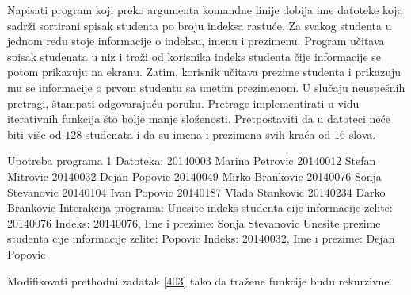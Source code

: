 \begin{Answer}[ref=402]
\end{Answer}
\begin{Exercise}[label=403]
  Napisati program koji preko argumenta komandne linije dobija ime
  datoteke koja sadrži sortirani spisak studenta po broju indeksa
  rastuće. Za svakog studenta u jednom redu stoje informacije o
  indeksu, imenu i prezimenu.  Program učitava spisak studenata u niz
  i traži od korisnika indeks studenta čije informacije se potom
  prikazuju na ekranu.  Zatim, korisnik učitava prezime studenta i
  prikazuju mu se informacije o prvom studentu sa unetim prezimenom.
  U slučaju neuspešnih pretragi, štampati odgovarajuću
  poruku. Pretrage implementirati u vidu iterativnih funkcija što
  bolje manje složenosti. Pretpostaviti da u datoteci neće biti više
  od $128$ studenata i da su imena i prezimena svih kraća od $16$
  slova.
  
\begin{maxitest}
\begin{test}{Upotreba programa 1}
Datoteka:
  20140003 Marina Petrovic
  20140012 Stefan Mitrovic
  20140032 Dejan Popovic
  20140049 Mirko Brankovic
  20140076 Sonja Stevanovic
  20140104 Ivan Popovic
  20140187 Vlada Stankovic
  20140234 Darko Brankovic
Interakcija programa:
  Unesite indeks studenta cije informacije zelite: 20140076
  Indeks: 20140076, Ime i prezime: Sonja Stevanovic
  Unesite prezime studenta cije informacije zelite: Popovic
  Indeks: 20140032, Ime i prezime: Dejan Popovic
\end{test}
\end{maxitest}


\end{Exercise}

\begin{Answer}[ref=403]
\end{Answer}
\begin{Exercise}[label=404]
  Modifikovati prethodni zadatak \ref{403} tako da tražene funkcije
  budu rekurzivne.


\end{Exercise}

